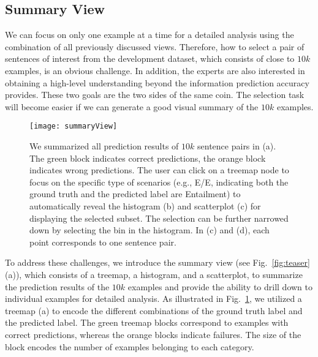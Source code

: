 

\subsection{Summary View}
\label{sec:allPairs}
We can focus on only one example at a time for a detailed analysis using the combination of all previously discussed views. Therefore, how to select a pair of sentences of interest from the development dataset, which consists of close to $10k$ examples, is an obvious challenge.
In addition, the experts are also interested in obtaining a high-level understanding beyond the information prediction accuracy provides.%
%
These two goals are the two sides of the same coin. 
The selection task will become easier if we can generate a good visual summary of the $10k$ examples.%

\begin{figure}[htbp]
\centering
\vspace{-2mm}
 \texttt{[image: summaryView]}
 \vspace{-6mm}
 \caption{
We summarized all prediction results of $10k$ sentence pairs in (a). The green block indicates correct predictions, the orange block indicates wrong predictions. %
%
The user can click on a treemap node to focus on the specific type of scenarios (e.g., E/E, indicating both the ground truth and the predicted label are Entailment) to automatically reveal the histogram (b) and scatterplot (c) for displaying the selected subset.
%
The selection can be further narrowed down by selecting the bin in the histogram.
In (c) and (d), each point corresponds to one sentence pair.
 }
 \vspace{-2mm}
\label{fig:summaryView}
\end{figure}

To address these challenges, we introduce the summary view (see Fig.~\ref{fig:teaser}(a)), which consists of a treemap, a histogram, and a scatterplot, to summarize the prediction results of the $10k$ examples and provide the ability to drill down to individual examples for detailed analysis.
As illustrated in Fig.~\ref{fig:summaryView}, we utilized a treemap (a) to encode the different combinations of the ground truth label and the predicted label. The green treemap blocks correspond to examples with correct predictions, whereas the orange blocks indicate failures. The size of the block encodes the number of examples belonging to each category.

